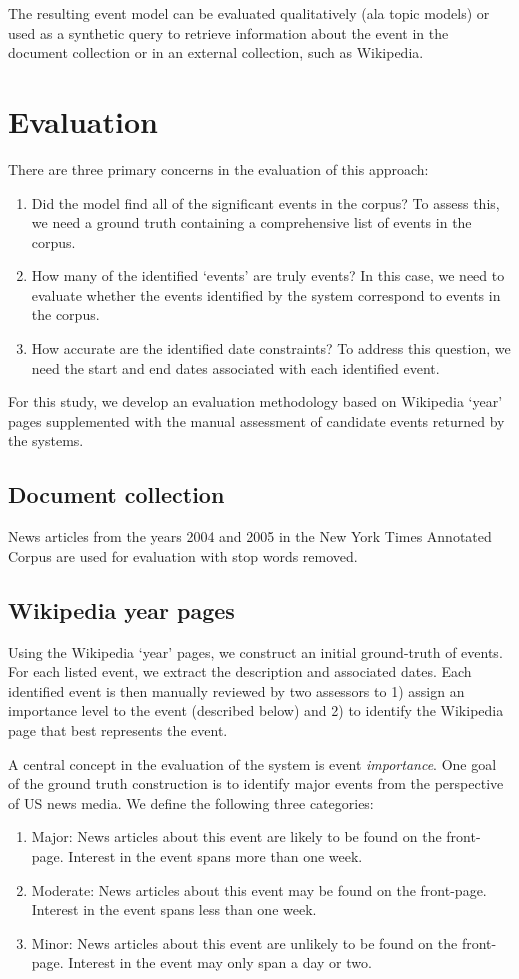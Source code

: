 \documentclass{sig-alternate}
\begin{document}
The resulting event model can be evaluated qualitatively (ala topic models) or used as a synthetic query to retrieve information about the event in the document collection or in an external collection, such as Wikipedia.


\section{Evaluation}
There are three primary concerns in the evaluation of this approach:
\begin{enumerate}
\item Did the model find all of the significant events in the corpus? To assess this, we need a ground truth containing a comprehensive list of events in the corpus. 
\item How many of the identified `events' are truly events? In this case, we need to evaluate whether the events identified by the system correspond to events in the corpus.  
\item How accurate are the identified date constraints? To address this question, we need the start and end dates associated with each identified event.
\end{enumerate}

For this study, we develop an evaluation methodology based on Wikipedia `year' pages supplemented with the manual assessment of candidate events returned by the systems.

\subsection{Document collection}
News articles from the years 2004 and 2005 in the New York Times Annotated Corpus are used for evaluation with stop words removed. 

\subsection{Wikipedia year pages}
Using the Wikipedia `year' pages, we construct an initial ground-truth of events. For each listed event, we extract the description and associated dates. Each identified event is then manually reviewed by two assessors to 1) assign an importance level to the event (described below) and 2) to identify the Wikipedia page that best represents the event.  

A central concept in the evaluation of the system is event \emph{importance}. One goal of the ground truth construction is to identify major events from the perspective of US news media. We define the following three categories:
\begin{enumerate}
\item Major: News articles about this event are likely to be found on the front-page. Interest in the event spans more than one week.
\item Moderate: News articles about this event may be found on the front-page. Interest in the event spans less than one week.
\item Minor: News articles about this event are unlikely to be found on the front-page. Interest in the event may only span a day or two.
\end{enumerate}
\end{document}

